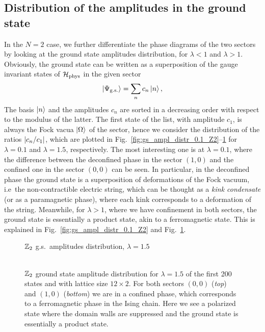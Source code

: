\subsection{Distribution of the amplitudes in the ground state}
\label{sub:amplitudes_distribution}

In the $N=2$ case, we further differentiate the phase diagrams of the two sectors by looking at the ground state amplitudes distribution, for $\lambda<1$ and $\lambda>1$.
Obviously, the ground state can be written as a superposition of the gauge invariant states of $\mathcal{H}_{\text{phys}}$ in the given sector
\begin{equation}
    \ket{\Psi_{\text{g.s.} }}= \sum_n c_n \ket{n},
    \label{eq:gs_amplitudes}
\end{equation}
The basis $\ket{n}$ and the amplitudes $c_n$ are sorted in a decreasing order with respect to the modulus of the latter.
The first state of the list, with amplitude $c_1$, is always the Fock vacua $\ket{\Omega}$ of the sector, hence we consider the distribution of the ratios $\abs{c_n / c_1}$, which are plotted in Fig.~\ref{fig:gs_ampl_distr_0.1_Z2}--\ref{fig:gs_ampl_distr_1.5_Z2} for $\lambda=0.1$ and $\lambda=1.5$, respectively.
The most interesting one is at $\lambda = 0.1$, where the difference between the deconfined phase in the sector $(1,0)$ and the confined one in the sector $(0,0)$ can be seen.
In particular, in the deconfined phase the ground state is a superposition of deformations of the Fock vacuum, i.e~the non-contractible electric string, which can be thought as a \emph{kink condensate} \cite{fradkin1978order} (or as a paramagnetic phase), where each kink corresponds to a deformation of the string.
Meanwhile, for $\lambda > 1$, where we have confinement in both sectors, the ground state is essentially a product state, akin to a ferromagnetic state.
This is explained in Fig.~\ref{fig:gs_ampl_distr_0.1_Z2} and Fig.~\ref{fig:gs_ampl_distr_1.5_Z2}.


\begin{figure}[h]
    \centering
    \hspace{3em}$\mathbb{Z}_2$ g.s.~amplitudes distribution, $\lambda=1.5$\\[5pt]
    \\[-2pt]\hspace{0.4pt}
    
    \caption{
    $\mathbb{Z}_2$ ground state amplitude distribution for $\lambda=1.5$ of the first 200 states and with lattice size $12 \times 2$.
    For both sectors $(0,0)$ (\emph{top}) and $(1,0)$ (\emph{bottom}) we are in a confined phase, which corresponds to a ferromagnetic phase in the Ising chain.
    Here we see a polarized state where the domain walls are suppressed and the ground state is essentially a product state.
    }
    \label{fig:gs_ampl_distr_1.5_Z2}
\end{figure}


